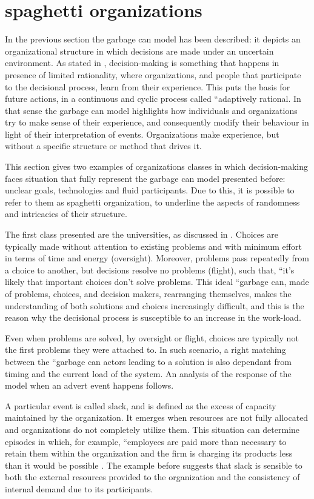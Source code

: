 \section{spaghetti organizations}
In the previous section the garbage can model has been described: it depicts an organizational structure in which decisions are made under an uncertain environment. As stated in \cite{4}, decision-making is something that happens in presence of limited rationality, where organizations, and people that participate to the decisional process, learn from their experience. This puts the basis for future actions, in a continuous and cyclic process called ``adaptively rational. In that sense the garbage can model highlights how individuals and organizations try to make sense of their experience, and consequently modify their behaviour in light of their interpretation of events. Organizations make experience, but without a specific structure or method that drives it.

This section gives two examples of organizations classes in which decision-making faces situation that fully represent the garbage can model presented before: unclear goals, technologies and fluid participants. Due to this, it is possible to refer to them as spaghetti organization, to underline the aspects of randomness and intricacies of their structure.

The first class presented are the universities, as discussed in \cite{1}. Choices are typically made without attention to existing problems and with minimum effort in terms of time and energy (oversight). Moreover, problems pass repeatedly from a choice to another, but decisions resolve no problems (flight), such that, ``it’s likely that important choices don’t solve problems. This ideal ``garbage can, made of problems, choices, and decision makers, rearranging themselves, makes the understanding of both solutions and choices increasingly difficult, and this is the reason why the decisional process is susceptible to an increase in the work-load.

Even when problems are solved, by oversight or flight, choices are typically not the first problems they were attached to. In such scenario, a right matching between the ``garbage can actors leading to a solution is also dependant from timing and the current load of the system.
An analysis of the response of the model when an advert event happens follows.

A particular event is called slack, and is defined as the excess of capacity maintained by the organization. It emerges when resources are not fully allocated and organizations do not completely utilize them. This situation can determine episodes in which, for example, ``employees are paid more than necessary to retain them within the organization and the firm is charging its products less than it would be possible \cite{13}. The example before suggests that slack is sensible to both the external resources provided to the organization and the consistency of internal demand due to its participants.

